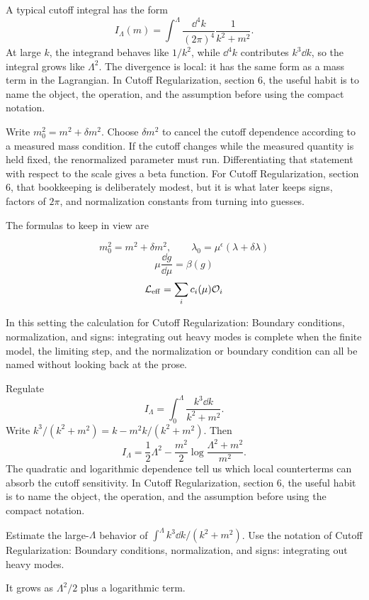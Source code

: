 A typical cutoff integral has the form
\[
  I_\Lambda(m)=\int^{\Lambda}\frac{\dd^4k}{(2\pi)^4}\frac{1}{k^2+m^2}.
\]
At large \(k\), the integrand behaves like \(1/k^2\), while \(\dd^4k\) contributes \(k^3\dd k\), so the integral grows like \(\Lambda^2\).  The divergence is local: it has the same form as a mass term in the Lagrangian.  In Cutoff Regularization, section 6, the useful habit is to name the object, the operation, and the assumption before using the compact notation.

Write \(m_0^2=m^2+\delta m^2\).  Choose \(\delta m^2\) to cancel the cutoff dependence according to a measured mass condition.  If the cutoff changes while the measured quantity is held fixed, the renormalized parameter must run.  Differentiating that statement with respect to the scale gives a beta function.  For Cutoff Regularization, section 6, that bookkeeping is deliberately modest, but it is what later keeps signs, factors of \(2\pi\), and normalization constants from turning into guesses.

The formulas to keep in view are

\[
  m_0^2=m^2+\delta m^2,\qquad \lambda_0=\mu^\epsilon(\lambda+\delta\lambda)
\]
\[
  \mu\frac{\dd g}{\dd\mu}=\beta(g)
\]
\[
  \mathcal L_{\mathrm{eff}}=\sum_i c_i(\mu)\mathcal O_i
\]

In this setting the calculation for Cutoff Regularization: Boundary conditions, normalization, and signs: integrating out heavy modes is complete when the finite model, the limiting step, and the normalization or boundary condition can all be named without looking back at the prose.




\begin{example}
Regulate
\[
  I_\Lambda=\int_0^\Lambda\frac{k^3\dd k}{k^2+m^2}.
\]
Write \(k^3/(k^2+m^2)=k-m^2k/(k^2+m^2)\).  Then
\[
  I_\Lambda=\frac12\Lambda^2-\frac{m^2}{2}\log\frac{\Lambda^2+m^2}{m^2}.
\]
The quadratic and logarithmic dependence tell us which local counterterms can absorb the cutoff sensitivity.  In Cutoff Regularization, section 6, the useful habit is to name the object, the operation, and the assumption before using the compact notation.
\end{example}



\begin{exercise}
Estimate the large-\(\Lambda\) behavior of \(\int^\Lambda k^3\dd k/(k^2+m^2)\).  Use the notation of Cutoff Regularization: Boundary conditions, normalization, and signs: integrating out heavy modes.
\begin{answer}
It grows as \(\Lambda^2/2\) plus a logarithmic term.
\end{answer}
\end{exercise}

